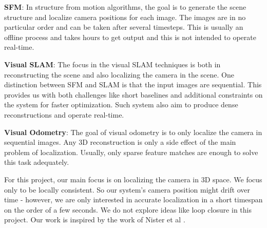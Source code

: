 \documentclass{article}
\begin{document}
\textbf{SFM}: In structure from motion algorithms, the goal is to generate the scene structure and localize camera positions for each image. The images are in no particular order and can be taken after several timesteps. This is usually an offline process and takes hours to get output and this is not intended to operate real-time.

\textbf{Visual SLAM}: The focus in the visual SLAM techniques is both in reconstructing the scene and also localizing the camera in the scene. One distinction between SFM and SLAM is that the input images are sequential. This provides us with both challenges like short baselines and additional constraints on the system for faster optimization. Such system also aim to produce dense reconstructions and operate real-time.

\textbf{Visual Odometry}: The goal of visual odometry is to only localize the camera in sequential images. Any 3D reconstruction is only a side effect of the main problem of localization. Usually, only sparse feature matches are enough to solve this task adequately.

For this project, our main focus is on localizing the camera in 3D space. We focus only to be locally consistent. So our system's camera position might drift over time - however, we are only interested in accurate localization in a short timespan on the order of a few seconds. We do not explore ideas like loop closure in this project. Our work is inspired by the work of Nister et al \cite{vo}.
\end{document}
